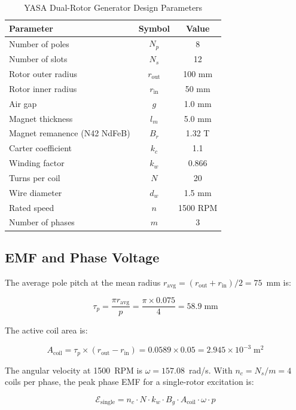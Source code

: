 \documentclass[12pt,a4paper]{article}
\begin{document}
\begin{table}[!htbp]
\centering
\caption{YASA Dual-Rotor Generator Design Parameters}
\label{tab:design_params}
\begin{tabular}{|l|c|c|}
\hline
\textbf{Parameter} & \textbf{Symbol} & \textbf{Value} \\
\hline
Number of poles & $N_p$ & 8 \\
Number of slots & $N_s$ & 12 \\
Rotor outer radius & $r_{\text{out}}$ & 100 mm \\
Rotor inner radius & $r_{\text{in}}$ & 50 mm \\
Air gap & $g$ & 1.0 mm \\
Magnet thickness & $l_m$ & 5.0 mm \\
Magnet remanence (N42 NdFeB) & $B_r$ & 1.32 T \\
Carter coefficient & $k_c$ & 1.1 \\
Winding factor & $k_w$ & 0.866 \\
Turns per coil & $N$ & 20 \\
Wire diameter & $d_w$ & 1.5 mm \\
Rated speed & $n$ & 1500 RPM \\
Number of phases & $m$ & 3 \\
\hline
\end{tabular}
\end{table}

\subsection{EMF and Phase Voltage}
The average pole pitch at the mean radius $r_{\text{avg}} = (r_{\text{out}} + r_{\text{in}})/2 = 75$~mm is:

\begin{equation}
\tau_p = \frac{\pi r_{\text{avg}}}{p} = \frac{\pi \times 0.075}{4} = 58.9 \; \text{mm}
\end{equation}

The active coil area is:

\begin{equation}
A_{\text{coil}} = \tau_p \times (r_{\text{out}} - r_{\text{in}}) = 0.0589 \times 0.05 = 2.945 \times 10^{-3} \; \text{m}^2
\end{equation}

The angular velocity at 1500~RPM is $\omega = 157.08$~rad/s. With $n_c = N_s / m = 4$ coils per phase, the peak phase EMF for a single-rotor excitation is:

\begin{equation}
\mathcal{E}_{\text{single}} = n_c \cdot N \cdot k_w \cdot B_g \cdot A_{\text{coil}} \cdot \omega \cdot p
\end{equation}
\end{document}
